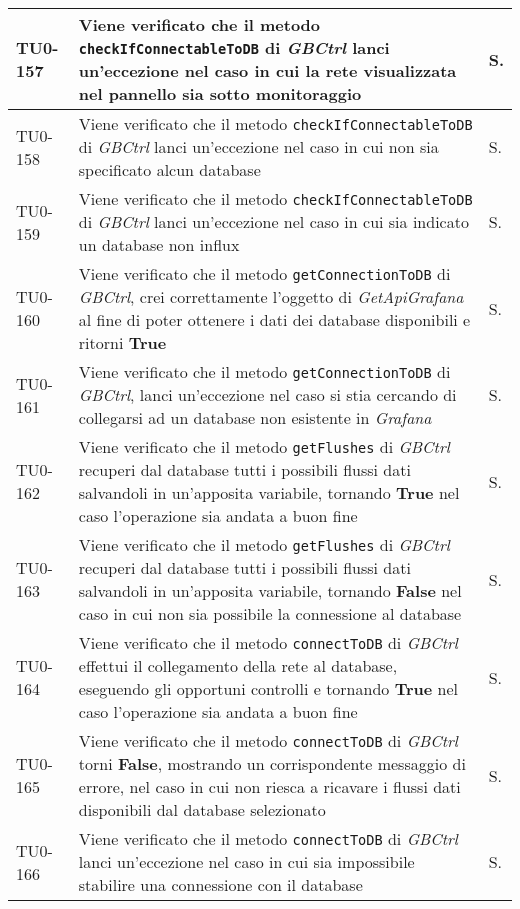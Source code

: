 \begin{longtable}{|C{.15\textwidth}|m{.66\textwidth}|C{.10\textwidth}|}
\hline
{}TU0-157 & Viene verificato che il metodo \texttt{checkIfConnectableToDB} di \textit{GBCtrl} lanci un'eccezione nel caso in cui la rete visualizzata nel pannello sia sotto monitoraggio & S.\\
\hline
TU0-158 & Viene verificato che il metodo \texttt{checkIfConnectableToDB} di \textit{GBCtrl} lanci un'eccezione nel caso in cui non sia specificato alcun database & S.\\
\hline
{}TU0-159 & Viene verificato che il metodo \texttt{checkIfConnectableToDB} di \textit{GBCtrl} lanci un'eccezione nel caso in cui sia indicato un database non influx & S.\\
\hline
TU0-160 & Viene verificato che il metodo \texttt{getConnectionToDB} di \textit{GBCtrl}, crei correttamente l'oggetto di \textit{GetApiGrafana} al fine di poter ottenere i dati dei database disponibili e ritorni \textbf{True} & S.\\
\hline
{}TU0-161 & Viene verificato che il metodo \texttt{getConnectionToDB} di \textit{GBCtrl}, lanci un'eccezione nel caso si stia cercando di collegarsi ad un database non esistente in \textit{Grafana} & S.\\
\hline
TU0-162 & Viene verificato che il metodo \texttt{getFlushes} di \textit{GBCtrl} recuperi dal database tutti i possibili flussi dati salvandoli in un'apposita variabile, tornando \textbf{True} nel caso l'operazione sia andata a buon fine & S.\\
\hline
{}TU0-163 & Viene verificato che il metodo \texttt{getFlushes} di \textit{GBCtrl} recuperi dal database tutti i possibili flussi dati salvandoli in un'apposita variabile, tornando \textbf{False} nel caso in cui non sia possibile la connessione al database & S.\\
\hline
TU0-164 & Viene verificato che il metodo \texttt{connectToDB} di \textit{GBCtrl} effettui il collegamento della rete al database, eseguendo gli opportuni controlli e tornando \textbf{True} nel caso l'operazione sia andata a buon fine & S.\\
\hline
{}TU0-165 & Viene verificato che il metodo \texttt{connectToDB} di \textit{GBCtrl} torni \textbf{False}, mostrando un corrispondente messaggio di errore, nel caso in cui non riesca a ricavare i flussi dati disponibili dal database selezionato & S.\\
\hline
TU0-166 & Viene verificato che il metodo \texttt{connectToDB} di \textit{GBCtrl} lanci un'eccezione nel caso in cui sia impossibile stabilire una connessione con il database & S.\\

\end{longtable}
